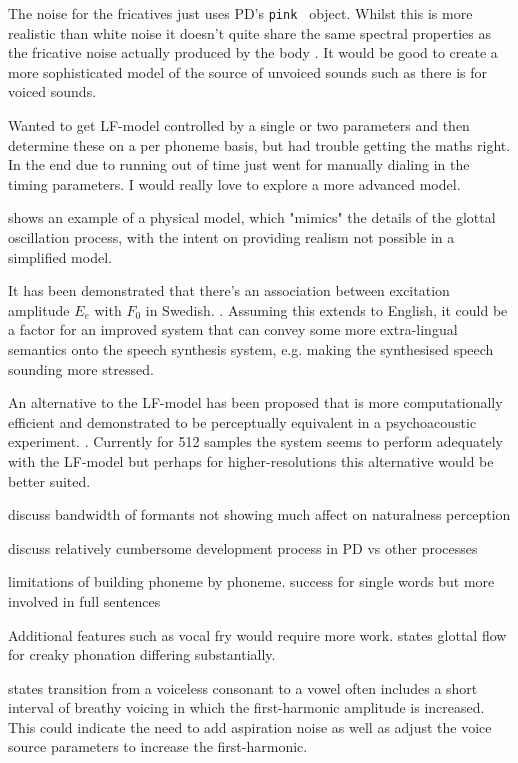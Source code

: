 The noise for the fricatives just uses PD's \texttt{pink~} object. Whilst this is more realistic than white noise it doesn't quite share the same spectral properties as the fricative noise actually produced by the body \cite{Johnson2003}. It would be good to create a more sophisticated model of the source of unvoiced sounds such as there is for voiced sounds.


Wanted to get LF-model controlled by a single or two parameters and then determine these on a per phoneme basis, but had trouble getting the maths right. In the end due to running out of time just went for manually dialing in the timing parameters. I would really love to explore a more advanced model.

\cite{Liljencrants1995} shows an example of a physical model, which "mimics" the details of the glottal oscillation process, with the intent on providing realism not possible in a simplified model. 

It has been demonstrated that there's an association between excitation amplitude $E_e$ with $F_0$ in Swedish. \cite{Fant1994}. Assuming this extends to English, it could be a factor for an improved system that can convey some more extra-lingual semantics onto the speech synthesis system, e.g. making the synthesised speech sounding more stressed.

An alternative to the LF-model has been proposed that is more computationally efficient and demonstrated to be perceptually equivalent in a psychoacoustic experiment. \cite{Veldhuis1998}. Currently for 512 samples the system seems to perform adequately with the LF-model but perhaps for higher-resolutions this alternative would be better suited.

discuss bandwidth of formants not showing much affect on naturalness perception

discuss relatively cumbersome development process in PD vs other processes

limitations of building phoneme by phoneme. success for single words but more involved in full sentences

Additional features such as vocal fry would require more work. \cite{Gobl1988} states glottal flow for creaky phonation differing substantially.

\cite{Klatt1990} states transition from a voiceless consonant to a vowel often includes a short interval of breathy voicing in which the first-harmonic amplitude is increased. This could indicate the need to add aspiration noise as well as adjust the voice source parameters to increase the first-harmonic.

